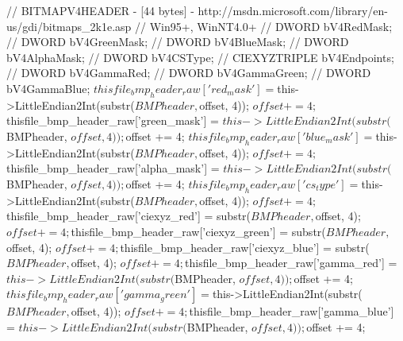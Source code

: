 \begin{DoxyCode}
{{{                                // BITMAPV4HEADER - [44 bytes] -
       http://msdn.microsoft.com/library/en-us/gdi/bitmaps_2k1e.asp
                                // Win95+, WinNT4.0+
                                // DWORD        bV4RedMask;
                                // DWORD        bV4GreenMask;
                                // DWORD        bV4BlueMask;
                                // DWORD        bV4AlphaMask;
                                // DWORD        bV4CSType;
                                // CIEXYZTRIPLE bV4Endpoints;
                                // DWORD        bV4GammaRed;
                                // DWORD        bV4GammaGreen;
                                // DWORD        bV4GammaBlue;
                                $thisfile_bmp_header_raw['red_mask']     = 
      $this->LittleEndian2Int(substr($BMPheader, $offset, 4));
                                $offset += 4;
                                $thisfile_bmp_header_raw['green_mask']   = 
      $this->LittleEndian2Int(substr($BMPheader, $offset, 4));
                                $offset += 4;
                                $thisfile_bmp_header_raw['blue_mask']    = 
      $this->LittleEndian2Int(substr($BMPheader, $offset, 4));
                                $offset += 4;
                                $thisfile_bmp_header_raw['alpha_mask']   = 
      $this->LittleEndian2Int(substr($BMPheader, $offset, 4));
                                $offset += 4;
                                $thisfile_bmp_header_raw['cs_type']      = 
      $this->LittleEndian2Int(substr($BMPheader, $offset, 4));
                                $offset += 4;
                                $thisfile_bmp_header_raw['ciexyz_red']   =     
                          substr($BMPheader, $offset, 4);
                                $offset += 4;
                                $thisfile_bmp_header_raw['ciexyz_green'] =     
                          substr($BMPheader, $offset, 4);
                                $offset += 4;
                                $thisfile_bmp_header_raw['ciexyz_blue']  =     
                          substr($BMPheader, $offset, 4);
                                $offset += 4;
                                $thisfile_bmp_header_raw['gamma_red']    = 
      $this->LittleEndian2Int(substr($BMPheader, $offset, 4));
                                $offset += 4;
                                $thisfile_bmp_header_raw['gamma_green']  = 
      $this->LittleEndian2Int(substr($BMPheader, $offset, 4));
                                $offset += 4;
                                $thisfile_bmp_header_raw['gamma_blue']   = 
      $this->LittleEndian2Int(substr($BMPheader, $offset, 4));
                                $offset += 4;

}}}
\end{DoxyCode}
